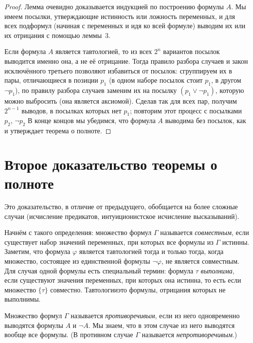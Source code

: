 \begin{proof}
Лемма очевидно доказывается индукцией по построению формулы $A$.
Мы имеем посылки, утверждающие истинность или ложность
переменных, и для всех подформул (начиная с переменных и идя ко
всей формуле) выводим их или их отрицания с помощью леммы~3.

Если формула $A$ является тавтологией, то из всех
$2^n$ вариантов посылок выводится именно она, а не её отрицание.
Тогда правило разбора случаев и закон исключённого третьего
позволяют избавиться от посылок: сгруппируем их в пары,
отличающиеся в позиции $p_1$ (в одном наборе посылок стоит
$p_1$, в другом $\lnot p_1$), по правилу разбора случаев заменим
их на посылку $(p_1\lor\lnot p_1)$, которую можно выбросить (она является
аксиомой). Сделав так для всех пар, получим
$2^{n-1}$ выводов, в посылках которых нет $p_1$; повторим этот
процесс с посылками $p_2$, $\lnot p_2$
 В конце концов мы убедимся, что формула $A$
выводима без посылок, как и утверждает
теорема о полноте.
\end{proof}

\section{Второе доказательство теоремы о полноте}
        \label{completeness-second-proof}%

Это доказательство, в отличие от предыдущего, обобщается
на более сложные случаи (исчисление предикатов, интуиционистское исчисление
высказываний).%

Начнём с такого определения: множество формул $\Gamma$
называется \emph{совместным},%
%
если существует набор значений
переменных, при которых все формулы из $\Gamma$ истинны.
Заметим, что формула $\varphi$ является тавтологией тогда и
только тогда, когда множество, состоящее из единственной формулы
$\lnot \varphi$, не является совместным. Для случая одной формулы есть
специальный термин: формула $\tau$ \emph{выполнима},%
%
если
существуют значения переменных, при которых она истинна, то есть
если множество $\{\tau\}$ совместно. Тавтологии\т это формулы,
отрицания которых не выполнимы.

Множество формул $\Gamma$ называется \emph{противоречивым},%
%
если
из него одновременно выводятся формулы $A$ и $\lnot A$. Мы
знаем, что в этом случае из него выводятся вообще все формулы.
(В противном случае $\Gamma$ называется
\emph{непротиворечивым}.)%
%


